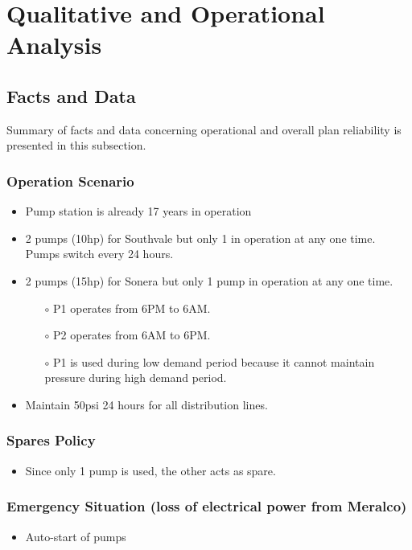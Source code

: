 %
\section{Qualitative and Operational Analysis}
\label{42}
\subsection{Facts and Data}

Summary of facts and data concerning operational and overall plan reliability is presented in this subsection.

\subsubsection{Operation Scenario}

\begin{itemize}
	\item Pump station is already 17 years in operation
	
	\item 2 pumps (10hp) for Southvale but only 1 in operation at any one time. Pumps switch every 24 hours.
	
	\item 2 pumps (15hp) for Sonera but only 1 pump in operation at any one time. 
	\begin{itemize}
		\item [$\circ$] P1 operates from 6PM to 6AM.
		\item [$\circ$] P2 operates from 6AM to 6PM.
		\item [$\circ$] P1 is used during low demand period because it cannot maintain pressure during high demand period.
	\end{itemize}
	\item Maintain 50psi 24 hours for all distribution lines.
\end{itemize}


\subsubsection{Spares Policy}

\begin{itemize}
	\item Since only 1 pump is used, the other acts as spare.
\end{itemize}

\subsubsection{Emergency Situation (loss of electrical power from Meralco)}
\begin{itemize}
	\item Auto-start of pumps
\end{itemize}

